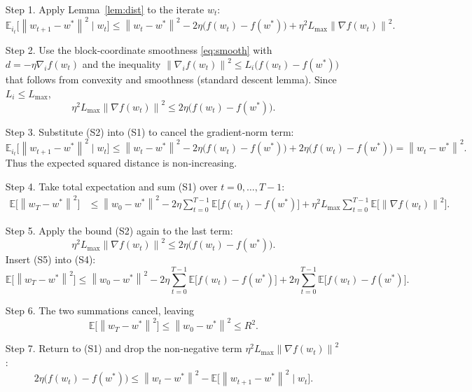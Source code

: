 \documentclass{article}
\newcommand{\E}{\mathbb{E}}
\newcommand{\norm}[1]{\left\|#1\right\|}
\begin{document}
\begin{enumerate}
\item[Step 1.] Apply Lemma~\ref{lem:dist} to the iterate $w_t$:
\[
\E_{i_t}\!\bigl[\norm{w_{t+1}-w^{\ast}}^{2}\mid w_t\bigr]
\le
\norm{w_t-w^{\ast}}^{2}
-2\eta\bigl(f(w_t)-f(w^{\ast})\bigr)
+\eta^{2}L_{\max}\norm{\nabla f(w_t)}^{2}.
\tag{S1}
\]

\item[Step 2.] Use the block‑coordinate smoothness \eqref{eq:smooth} with $d=-\eta\nabla_i f(w_t)$ and the inequality $ \norm{\nabla_i f(w_t)}^{2}\le L_i\bigl(f(w_t)-f(w^{\ast})\bigr)$ that follows from convexity and smoothness (standard descent lemma). Since $L_i\le L_{\max}$,
\[
\eta^{2}L_{\max}\norm{\nabla f(w_t)}^{2}
\le 2\eta\bigl(f(w_t)-f(w^{\ast})\bigr).
\tag{S2}
\]

\item[Step 3.] Substitute (S2) into (S1) to cancel the gradient‑norm term:
\[
\E_{i_t}\!\bigl[\norm{w_{t+1}-w^{\ast}}^{2}\mid w_t\bigr]
\le
\norm{w_t-w^{\ast}}^{2}
-2\eta\bigl(f(w_t)-f(w^{\ast})\bigr)
+2\eta\bigl(f(w_t)-f(w^{\ast})\bigr)
=
\norm{w_t-w^{\ast}}^{2}.
\tag{S3}
\]
Thus the expected squared distance is non‑increasing.

\item[Step 4.] Take total expectation and sum (S1) over $t=0,\dots ,T-1$:
\[
\begin{aligned}
\E\!\bigl[\norm{w_T-w^{\ast}}^{2}\bigr]
&\le
\norm{w_0-w^{\ast}}^{2}
-2\eta\sum_{t=0}^{T-1}\E\!\bigl[f(w_t)-f(w^{\ast})\bigr]
+\eta^{2}L_{\max}\sum_{t=0}^{T-1}\E\!\bigl[\norm{\nabla f(w_t)}^{2}\bigr].
\end{aligned}
\tag{S4}
\]

\item[Step 5.] Apply the bound (S2) again to the last term:
\[
\eta^{2}L_{\max}\norm{\nabla f(w_t)}^{2}
\le 2\eta\bigl(f(w_t)-f(w^{\ast})\bigr).
\tag{S5}
\]
Insert (S5) into (S4):
\[
\E\!\bigl[\norm{w_T-w^{\ast}}^{2}\bigr]
\le
\norm{w_0-w^{\ast}}^{2}
-2\eta\sum_{t=0}^{T-1}\E\!\bigl[f(w_t)-f(w^{\ast})\bigr]
+2\eta\sum_{t=0}^{T-1}\E\!\bigl[f(w_t)-f(w^{\ast})\bigr].
\tag{S6}
\]

\item[Step 6.] The two summations cancel, leaving
\[
\E\!\bigl[\norm{w_T-w^{\ast}}^{2}\bigr]\le \norm{w_0-w^{\ast}}^{2}\le R^{2}.
\tag{S7}
\]

\item[Step 7.] Return to (S1) and drop the non‑negative term $\eta^{2}L_{\max}\norm{\nabla f(w_t)}^{2}$:
\[
2\eta\bigl(f(w_t)-f(w^{\ast})\bigr)
\le
\norm{w_t-w^{\ast}}^{2}-\E\!\bigl[\norm{w_{t+1}-w^{\ast}}^{2}\mid w_t\bigr].
\tag{S8}
\]


\end{enumerate}
\end{document}
